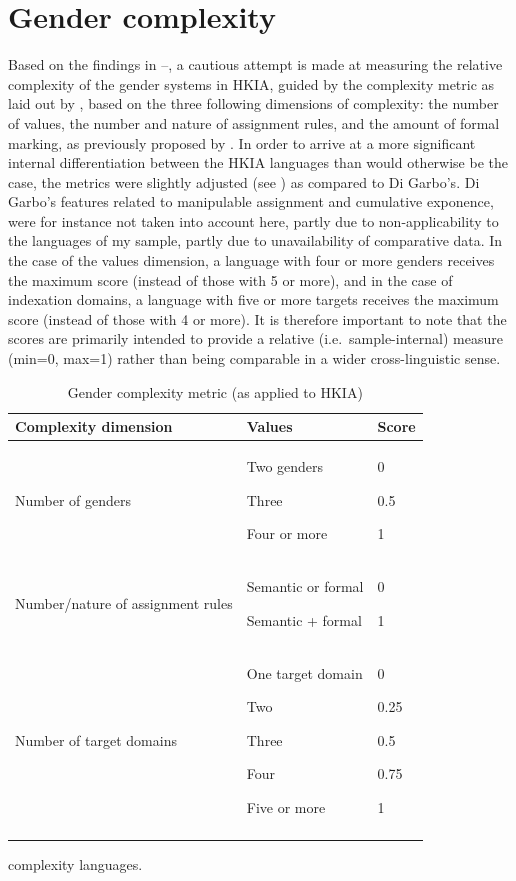 \documentclass[output=collectionpaper]{langsci/langscibook}
\begin{document}
\section{Gender complexity}
\largerpage
Based on the findings in --, a cautious attempt is made at measuring the relative complexity of the gender systems in HKIA, guided by the complexity metric as laid out by \citet{DiGarbo2016}, based on the three following dimensions of complexity: the number of values, the number and nature of assignment rules, and the amount of formal marking, as previously proposed by \citet{Audring2014}. In order to arrive at a more significant internal differentiation between the HKIA languages than would otherwise be the case, the metrics were slightly adjusted (see ) as compared to Di Garbo's. Di Garbo's features related to manipulable assignment and cumulative exponence, were for instance not taken into account here, partly due to non-applicability to the languages of my sample, partly due to unavailability of comparative data. In the case of the values dimension, a language with four or more genders receives the maximum score (instead of those with 5 or more), and in the case of indexation domains, a language with five or more targets receives the maximum score (instead of those with 4 or more). It is therefore important to note that the scores are primarily intended to provide a relative (i.e.\ sample-internal) measure (min=0, max=1) rather than being comparable in a wider cross-linguistic sense.


\begin{table}[htb]
\begin{tabularx}{0.9\textwidth}{Xp{3cm}p{1cm}}
\lsptoprule
Complexity dimension & Values & Score\\
\midrule
Number of genders & Two genders

Three

Four or more & 0

0.5

1\\
Number/nature of assignment rules & Semantic or formal

Semantic + formal & 0

1\\
Number of target domains & One target domain

Two

Three

Four

Five or more & 0

0.25

0.5

0.75

1\\
\lspbottomrule
\end{tabularx}
\caption{Gender complexity metric (as applied to HKIA)}
\label{tab:Lilje:12}
\end{table}
 complexity languages.
\end{document}
